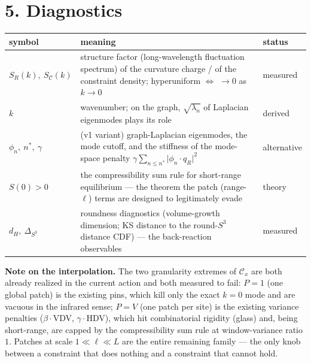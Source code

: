 \documentclass[11pt]{article}
\newcommand{\C}{\mathcal{C}}
\begin{document}
\section*{5. Diagnostics}

\begin{tabularx}{\textwidth}{@{}l L l@{}}
\toprule
symbol & meaning & status \\
\midrule
$S_R(k),\ S_{\C}(k)$ & structure factor (long-wavelength fluctuation spectrum) of the curvature charge / of the constraint density; hyperuniform $\Leftrightarrow$ $\to 0$ as $k\to 0$ & measured \\
$k$ & wavenumber; on the graph, $\sqrt{\lambda_n}$ of Laplacian eigenmodes plays its role & derived \\
$\phi_n,\ n^{*},\ \gamma$ & (v1 variant) graph-Laplacian eigenmodes, the mode cutoff, and the stiffness of the mode-space penalty $\gamma\sum_{n\le n^{*}}\lvert\phi_n\cdot q_R\rvert^2$ & alternative \\
$S(0)>0$ & the compressibility sum rule for short-range equilibrium --- the theorem the patch (range-$\ell$) terms are designed to legitimately evade & theory \\
$d_H,\ \Delta_{S^3}$ & roundness diagnostics (volume-growth dimension; KS distance to the round-$S^3$ distance CDF) --- the back-reaction observables & measured \\
\bottomrule
\end{tabularx}

\vspace{1.5em}
\noindent\textbf{Note on the interpolation.} The two granularity extremes of
$\C_x$ are both already realized in the current action and both measured to
fail: $P=1$ (one global patch) is the existing pins, which kill only the exact
$k=0$ mode and are vacuous in the infrared sense; $P=V$ (one patch per site) is
the existing variance penalties ($\beta\cdot$VDV, $\gamma\cdot$HDV), which hit
combinatorial rigidity (glass) and, being short-range, are capped by the
compressibility sum rule at window-variance ratio $1$. Patches at scale
$1 \ll \ell \ll L$ are the entire remaining family --- the only knob between a
constraint that does nothing and a constraint that cannot hold.
\end{document}
